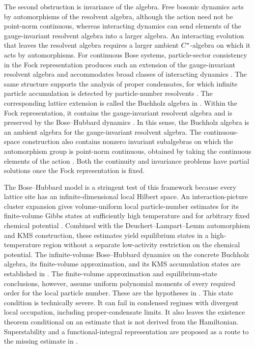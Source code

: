 \documentclass[11pt,a4paper]{article}
\theoremstyle{plain}
\theoremstyle{definition}
\theoremstyle{remark}
\begin{document}
The second obstruction is invariance of the algebra. Free bosonic dynamics acts by automorphisms of the resolvent algebra, although the action need not be point-norm continuous, whereas interacting dynamics can send elements of the gauge-invariant resolvent algebra into a larger algebra. An interacting evolution that leaves the resolvent algebra requires a larger ambient \(C^{\ast}\)-algebra on which it acts by automorphisms. For continuous Bose systems, particle-sector consistency in the Fock representation produces such an extension of the gauge-invariant resolvent algebra and accommodates broad classes of interacting dynamics \cite{DetlevBuchholz002,DetlevBuchholz003}. The same structure supports the analysis of proper condensates, for which infinite particle accumulation is detected by particle-number resolvents \cite{DetlevBuchholz004,DetlevBuchholz005}. The corresponding lattice extension is called the Buchholz algebra in \cite[Definition 2.2]{DeuchertLampartLemm001}. Within the Fock representation, it contains the gauge-invariant resolvent algebra and is preserved by the Bose--Hubbard dynamics \cite[Proposition 3.1]{DeuchertLampartLemm001}. In this sense, the Buchholz algebra is an ambient algebra for the gauge-invariant resolvent algebra. The continuous-space construction also contains nonzero invariant subalgebras on which the automorphism group is point-norm continuous, obtained by taking the continuous elements of the action \cite[Theorem 4.6]{DetlevBuchholz002}. Both the continuity and invariance problems have partial solutions once the Fock representation is fixed.

The Bose--Hubbard model is a stringent test of this framework because every lattice site has an infinite-dimensional local Hilbert space. An interaction-picture cluster expansion gives volume-uniform local particle-number estimates for its finite-volume Gibbs states at sufficiently high temperature and for arbitrary fixed chemical potential \cite[Theorem 1]{GongKuwaharaTong001}. Combined with the Deuchert--Lampart--Lemm automorphism and KMS construction, these estimates yield equilibrium states in a high-temperature region without a separate low-activity restriction on the chemical potential. The infinite-volume Bose--Hubbard dynamics on the concrete Buchholz algebra, its finite-volume approximation, and its KMS accumulation states are established in \cite[Proposition 3.1 and Theorems 4.1 and 5.2]{DeuchertLampartLemm001}. The finite-volume approximation and equilibrium-state conclusions, however, assume uniform polynomial moments of every required order for the local particle number. These are the hypotheses in \cite[equations (37) and (90)]{DeuchertLampartLemm001}. This state condition is technically severe. It can fail in condensed regimes with divergent local occupation, including proper-condensate limits. It also leaves the existence theorem conditional on an estimate that is not derived from the Hamiltonian. Superstability and a functional-integral representation are proposed as a route to the missing estimate in \cite[Remark 5.3]{DeuchertLampartLemm001}.
\end{document}
